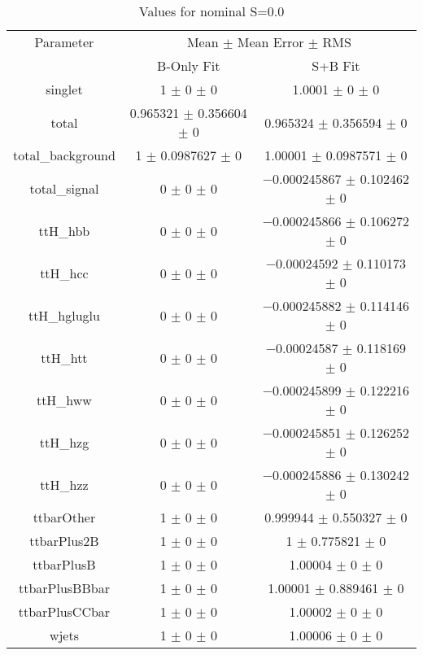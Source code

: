 \begin{table}
\centering
\caption{Values for nominal S=0.0}
\begin{tabular}{ccc}
\toprule
Parameter & \multicolumn{2}{c}{Mean $\pm$ Mean Error $\pm$ RMS}\\
 & B-Only Fit & S+B Fit\\
\midrule
singlet & \num{1} $\pm$ \num{0} $\pm$ \num{0} & \num{1.0001} $\pm$ \num{0} $\pm$ \num{0}\\
total & \num{0.965321} $\pm$ \num{0.356604} $\pm$ \num{0} & \num{0.965324} $\pm$ \num{0.356594} $\pm$ \num{0}\\
total\_background & \num{1} $\pm$ \num{0.0987627} $\pm$ \num{0} & \num{1.00001} $\pm$ \num{0.0987571} $\pm$ \num{0}\\
total\_signal & \num{0} $\pm$ \num{0} $\pm$ \num{0} & \num{-0.000245867} $\pm$ \num{0.102462} $\pm$ \num{0}\\
ttH\_hbb & \num{0} $\pm$ \num{0} $\pm$ \num{0} & \num{-0.000245866} $\pm$ \num{0.106272} $\pm$ \num{0}\\
ttH\_hcc & \num{0} $\pm$ \num{0} $\pm$ \num{0} & \num{-0.00024592} $\pm$ \num{0.110173} $\pm$ \num{0}\\
ttH\_hgluglu & \num{0} $\pm$ \num{0} $\pm$ \num{0} & \num{-0.000245882} $\pm$ \num{0.114146} $\pm$ \num{0}\\
ttH\_htt & \num{0} $\pm$ \num{0} $\pm$ \num{0} & \num{-0.00024587} $\pm$ \num{0.118169} $\pm$ \num{0}\\
ttH\_hww & \num{0} $\pm$ \num{0} $\pm$ \num{0} & \num{-0.000245899} $\pm$ \num{0.122216} $\pm$ \num{0}\\
ttH\_hzg & \num{0} $\pm$ \num{0} $\pm$ \num{0} & \num{-0.000245851} $\pm$ \num{0.126252} $\pm$ \num{0}\\
ttH\_hzz & \num{0} $\pm$ \num{0} $\pm$ \num{0} & \num{-0.000245886} $\pm$ \num{0.130242} $\pm$ \num{0}\\
ttbarOther & \num{1} $\pm$ \num{0} $\pm$ \num{0} & \num{0.999944} $\pm$ \num{0.550327} $\pm$ \num{0}\\
ttbarPlus2B & \num{1} $\pm$ \num{0} $\pm$ \num{0} & \num{1} $\pm$ \num{0.775821} $\pm$ \num{0}\\
ttbarPlusB & \num{1} $\pm$ \num{0} $\pm$ \num{0} & \num{1.00004} $\pm$ \num{0} $\pm$ \num{0}\\
ttbarPlusBBbar & \num{1} $\pm$ \num{0} $\pm$ \num{0} & \num{1.00001} $\pm$ \num{0.889461} $\pm$ \num{0}\\
ttbarPlusCCbar & \num{1} $\pm$ \num{0} $\pm$ \num{0} & \num{1.00002} $\pm$ \num{0} $\pm$ \num{0}\\
wjets & \num{1} $\pm$ \num{0} $\pm$ \num{0} & \num{1.00006} $\pm$ \num{0} $\pm$ \num{0}\\
\bottomrule
\end{tabular}
\end{table}